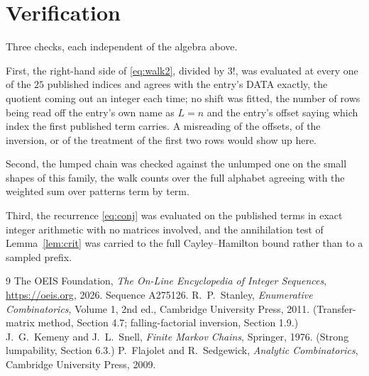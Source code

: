 \documentclass[11pt,a4paper]{article}
\theoremstyle{plain}
\theoremstyle{definition}
\begin{document}
\section{Verification}

Three checks, each independent of the algebra above.

First, the right-hand side of \eqref{eq:walk2}, divided by $3!$, was evaluated at every
one of the $25$ published indices and agrees with the entry's DATA exactly, the quotient
coming out an integer each time; no shift was fitted, the number of rows being read off the
entry's own name as $L=n$ and the entry's offset saying which index the first published
term carries. A misreading of the offsets, of the inversion, or of the treatment of the first
two rows would show up here.

Second, the lumped chain was checked against the unlumped one on the small shapes of this
family, the walk counts over the full alphabet agreeing with the weighted sum over patterns
term by term.

Third, the recurrence \eqref{eq:conj} was evaluated on the published terms in exact integer
arithmetic with no matrices involved, and the annihilation test of Lemma~\ref{lem:crit} was
carried to the full Cayley--Hamilton bound rather than to a sampled prefix.

\begin{thebibliography}{9}
 The OEIS Foundation, \emph{The On-Line Encyclopedia of Integer
Sequences}, \url{https://oeis.org}, 2026. Sequence A275126.
 R.~P.~Stanley, \emph{Enumerative Combinatorics}, Volume 1, 2nd ed.,
Cambridge University Press, 2011. (Transfer-matrix method, Section 4.7; falling-factorial
inversion, Section 1.9.)
 J.~G.~Kemeny and J.~L.~Snell, \emph{Finite Markov Chains}, Springer,
1976. (Strong lumpability, Section 6.3.)
 P.~Flajolet and R.~Sedgewick, \emph{Analytic Combinatorics}, Cambridge
University Press, 2009.
\end{thebibliography}
\end{document}
